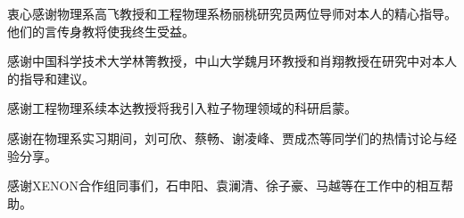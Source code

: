 
\begin{acknowledgements}
  衷心感谢物理系高飞教授和工程物理系杨丽桃研究员两位导师对本人的精心指导。他们的言传身教将使我终生受益。

  感谢中国科学技术大学林箐教授，中山大学魏月环教授和肖翔教授在研究中对本人的指导和建议。

  感谢工程物理系续本达教授将我引入粒子物理领域的科研启蒙。

  感谢在物理系实习期间，刘可欣、蔡畅、谢凌峰、贾成杰等同学们的热情讨论与经验分享。

  感谢XENON合作组同事们，石申阳、袁澜清、徐子豪、马越等在工作中的相互帮助。
\end{acknowledgements}
